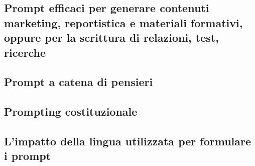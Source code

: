     \subsection{Prompt efficaci per generare contenuti marketing, reportistica e materiali formativi, oppure per la scrittura di relazioni, test, ricerche}
    
    \subsection{Prompt a catena di pensieri}
    
    \subsection{Prompting costituzionale}
    
    \subsection{L'impatto della lingua utilizzata per formulare i prompt }
